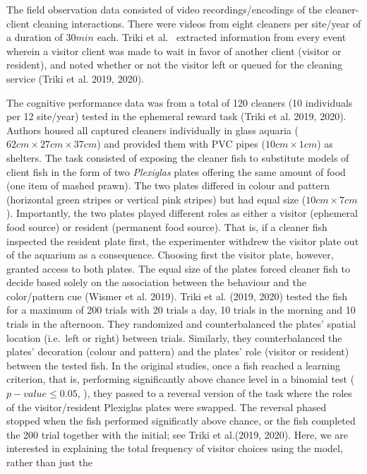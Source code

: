 \documentclass[
  12pt,
]{article}
\begin{document}
The field observation data consisted of video recordings/encodings of
the cleaner-client cleaning interactions. There were videos from eight
cleaners per site/year of a duration of \(30 min\) each. Triki et al.~
extracted information from every event wherein a visitor client was made
to wait in favor of another client (visitor or resident), and noted
whether or not the visitor left or queued for the cleaning service
(Triki et al. 2019, 2020).

The cognitive performance data was from a total of 120 cleaners (10
individuals per 12 site/year) tested in the ephemeral reward task (Triki
et al. 2019, 2020). Authors housed all captured cleaners individually in
glass aquaria (\(62cm \times 27cm \times 37 cm\)) and provided them with
PVC pipes (\(10 cm \times 1 cm\)) as shelters. The task consisted of
exposing the cleaner fish to substitute models of client fish in the
form of two \emph{Plexiglas} plates offering the same amount of food
(one item of mashed prawn). The two plates differed in colour and
pattern (horizontal green stripes or vertical pink stripes) but had
equal size (\(10 cm \times 7 cm\)). Importantly, the two plates played
different roles as either a visitor (ephemeral food source) or resident
(permanent food source). That is, if a cleaner fish inspected the
resident plate first, the experimenter withdrew the visitor plate out of
the aquarium as a consequence. Choosing first the visitor plate,
however, granted access to both plates. The equal size of the plates
forced cleaner fish to decide based solely on the association between
the behaviour and the color/pattern cue (Wismer et al. 2019). Triki et
al. (2019, 2020) tested the fish for a maximum of 200 trials with 20
trials a day, 10 trials in the morning and 10 trials in the afternoon.
They randomized and counterbalanced the plates' spatial location
(i.e.~left or right) between trials. Similarly, they counterbalanced the
plates' decoration (colour and pattern) and the plates' role (visitor or
resident) between the tested fish. In the original studies, once a fish
reached a learning criterion, that is, performing significantly above
chance level in a binomial test (\(p-value \leq 0.05\), ), they passed
to a reversal version of the task where the roles of the
visitor/resident Plexiglas plates were swapped. The reversal phased
stopped when the fish performed significatly above chance, or the fish
completed the 200 trial together with the initial; see Triki et
al.(2019, 2020). Here, we are interested in explaining the total
frequency of visitor choices using the model, rather than just the
\end{document}

